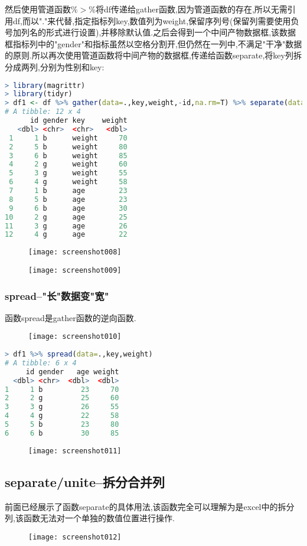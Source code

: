 \documentclass[11pt,a4paper,oneside]{book}
\begin{document}
然后使用管道函数$ \%>\% $将df传递给gather函数,因为管道函数的存在,所以无需引用df,而以"."来代替,指定指标列key,数值列为weight,保留序列号(保留列需要使用负号加列名的形式进行设置),并移除默认值.之后会得到一个中间产物数据框,该数据框指标列中的"gender"和指标虽然以空格分割开,但仍然在一列中,不满足"干净"数据的原则.所以再次使用管道函数将中间产物的数据框,传递给函数separate,将key列拆分成两列,分别为性别和key:
\begin{lstlisting}[language=r]
> library(magrittr)
> library(tidyr)
> df1 <- df %>% gather(data=.,key,weight,-id,na.rm=T) %>% separate(data=.,key,into=c("gender","key"))
# A tibble: 12 x 4
      id gender key    weight
   <dbl> <chr>  <chr>   <dbl>
 1     1 b      weight     70
 2     5 b      weight     80
 3     6 b      weight     85
 4     2 g      weight     60
 5     3 g      weight     55
 6     4 g      weight     58
 7     1 b      age        23
 8     5 b      age        23
 9     6 b      age        30
10     2 g      age        25
11     3 g      age        26
12     4 g      age        22
\end{lstlisting}
\begin{figure}[H]
	\centering
	\texttt{[image: screenshot008]}
\end{figure}
\begin{figure}[H]
	\centering
	\texttt{[image: screenshot009]}
\end{figure}
\subsubsection{spread--"长"数据变"宽"}
函数spread是gather函数的逆向函数.
\begin{figure}[H]
	\centering
	\texttt{[image: screenshot010]}
\end{figure}

\begin{lstlisting}[language=r]
> df1 %>% spread(data=.,key,weight)
# A tibble: 6 x 4
     id gender   age weight
  <dbl> <chr>  <dbl>  <dbl>
1     1 b         23     70
2     2 g         25     60
3     3 g         26     55
4     4 g         22     58
5     5 b         23     80
6     6 b         30     85
\end{lstlisting}

\begin{figure}[H]
	\centering
	\texttt{[image: screenshot011]}
\end{figure}

\subsection{separate/unite--拆分合并列}
前面已经展示了函数separate的具体用法,该函数完全可以理解为是excel中的拆分列,该函数无法对一个单独的数值位置进行操作.
\begin{figure}[H]
	\centering
	\texttt{[image: screenshot012]}
\end{figure}
\end{document}
